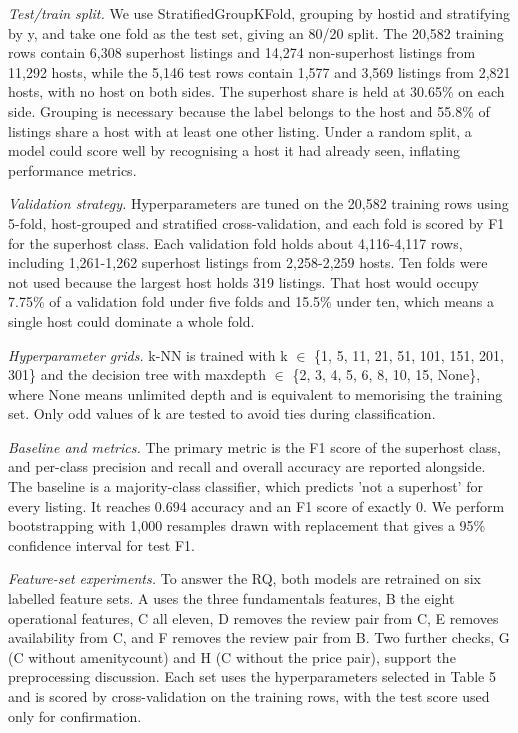 \documentclass[final,1p,11pt]{elsarticle}
\renewcommand\_{\textunderscore\allowbreak}%
\begin{document}
\textit{Test/train split.} We use StratifiedGroupKFold, grouping by host\_id and stratifying by y, and take one fold as the test set, giving an 80/20 split. The 20,582 training rows contain 6,308 superhost listings and 14,274 non-superhost listings from 11,292 hosts, while the 5,146 test rows contain 1,577 and 3,569 listings from 2,821 hosts, with no host on both sides. The superhost share is held at 30.65\% on each side. Grouping is necessary because the label belongs to the host and 55.8\% of listings share a host with at least one other listing. Under a random split, a model could score well by recognising a host it had already seen, inflating performance metrics.

\textit{Validation strategy.} Hyperparameters are tuned on the 20,582 training rows using 5-fold, host-grouped and stratified cross-validation, and each fold is scored by F1 for the superhost class. Each validation fold holds about 4,116-4,117 rows, including 1,261-1,262 superhost listings from 2,258-2,259 hosts. Ten folds were not used because the largest host holds 319 listings. That host would occupy 7.75\% of a validation fold under five folds and 15.5\% under ten, which means a single host could dominate a whole fold.

\textit{Hyperparameter grids.} k-NN is trained with k $\in$ \{1, 5, 11, 21, 51, 101, 151, 201, 301\} and the decision tree with max\_depth $\in$ \{2, 3, 4, 5, 6, 8, 10, 15, None\}, where None means unlimited depth and is equivalent to memorising the training set. Only odd values of k are tested to avoid ties during classification.

\textit{Baseline and metrics.} The primary metric is the F1 score of the superhost class, and per-class precision and recall and overall accuracy are reported alongside. The baseline is a majority-class classifier, which predicts 'not a superhost' for every listing. It reaches 0.694 accuracy and an F1 score of exactly 0. We perform bootstrapping with 1,000 resamples drawn with replacement that  gives a 95\% confidence interval for test F1.  

\textit{Feature-set experiments.} To answer the RQ, both models are retrained on six labelled feature sets. A uses the three fundamentals features, B the eight operational features, C all eleven, D removes the review pair from C, E removes availability\_365 from C, and F removes the review pair from B. Two further checks, G (C without amenity\_count) and H (C without the price pair), support the preprocessing discussion. Each set uses the hyperparameters selected in Table 5 and is scored by cross-validation on the training rows, with the test score used only for confirmation.
\end{document}
